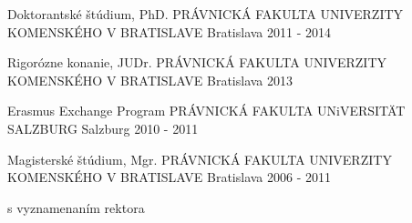 

\begin{cventries}

  \cventry
    {Doktorantské štúdium, PhD.} %
    {PRÁVNICKÁ FAKULTA UNIVERZITY KOMENSKÉHO V BRATISLAVE} %
    {Bratislava} %
    {2011 - 2014} %
    {
    }

  \cventry
    {Rigorózne konanie, JUDr.} %
    {PRÁVNICKÁ FAKULTA UNIVERZITY KOMENSKÉHO V BRATISLAVE} %
    {Bratislava} %
    {2013} %
    {
    }

  \cventry
    {Erasmus Exchange Program} %
    {PRÁVNICKÁ FAKULTA UNiVERSITÄT SALZBURG} %
    {Salzburg} %
    {2010 - 2011} %
    {
    }

  \cventry
    {Magisterské štúdium, Mgr.} %
    {PRÁVNICKÁ FAKULTA UNIVERZITY KOMENSKÉHO V BRATISLAVE} %
    {Bratislava} %
    {2006 - 2011} %
    {
      \begin{cvitems} %
        \item {s vyznamenaním rektora}
      \end{cvitems}
    }

\end{cventries}
